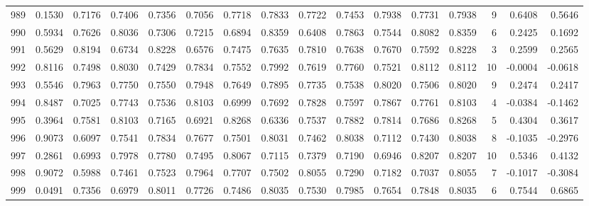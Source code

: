 \begin{tabular}{lrrrrrrrrrrrrrrr}
989 &      0.1530 &  0.7176 &  0.7406 &  0.7356 &  0.7056 &  0.7718 &  0.7833 &  0.7722 &  0.7453 &  0.7938 &   0.7731 &     0.7938 &      9 &                    0.6408 &                     0.5646 \\
990 &      0.5934 &  0.7626 &  0.8036 &  0.7306 &  0.7215 &  0.6894 &  0.8359 &  0.6408 &  0.7863 &  0.7544 &   0.8082 &     0.8359 &      6 &                    0.2425 &                     0.1692 \\
991 &      0.5629 &  0.8194 &  0.6734 &  0.8228 &  0.6576 &  0.7475 &  0.7635 &  0.7810 &  0.7638 &  0.7670 &   0.7592 &     0.8228 &      3 &                    0.2599 &                     0.2565 \\
992 &      0.8116 &  0.7498 &  0.8030 &  0.7429 &  0.7834 &  0.7552 &  0.7992 &  0.7619 &  0.7760 &  0.7521 &   0.8112 &     0.8112 &     10 &                   -0.0004 &                    -0.0618 \\
993 &      0.5546 &  0.7963 &  0.7750 &  0.7550 &  0.7948 &  0.7649 &  0.7895 &  0.7735 &  0.7538 &  0.8020 &   0.7506 &     0.8020 &      9 &                    0.2474 &                     0.2417 \\
994 &      0.8487 &  0.7025 &  0.7743 &  0.7536 &  0.8103 &  0.6999 &  0.7692 &  0.7828 &  0.7597 &  0.7867 &   0.7761 &     0.8103 &      4 &                   -0.0384 &                    -0.1462 \\
995 &      0.3964 &  0.7581 &  0.8103 &  0.7165 &  0.6921 &  0.8268 &  0.6336 &  0.7537 &  0.7882 &  0.7814 &   0.7686 &     0.8268 &      5 &                    0.4304 &                     0.3617 \\
996 &      0.9073 &  0.6097 &  0.7541 &  0.7834 &  0.7677 &  0.7501 &  0.8031 &  0.7462 &  0.8038 &  0.7112 &   0.7430 &     0.8038 &      8 &                   -0.1035 &                    -0.2976 \\
997 &      0.2861 &  0.6993 &  0.7978 &  0.7780 &  0.7495 &  0.8067 &  0.7115 &  0.7379 &  0.7190 &  0.6946 &   0.8207 &     0.8207 &     10 &                    0.5346 &                     0.4132 \\
998 &      0.9072 &  0.5988 &  0.7461 &  0.7523 &  0.7964 &  0.7707 &  0.7502 &  0.8055 &  0.7290 &  0.7182 &   0.7037 &     0.8055 &      7 &                   -0.1017 &                    -0.3084 \\
999 &      0.0491 &  0.7356 &  0.6979 &  0.8011 &  0.7726 &  0.7486 &  0.8035 &  0.7530 &  0.7985 &  0.7654 &   0.7848 &     0.8035 &      6 &                    0.7544 &                     0.6865 \\
\bottomrule
\end{tabular}
